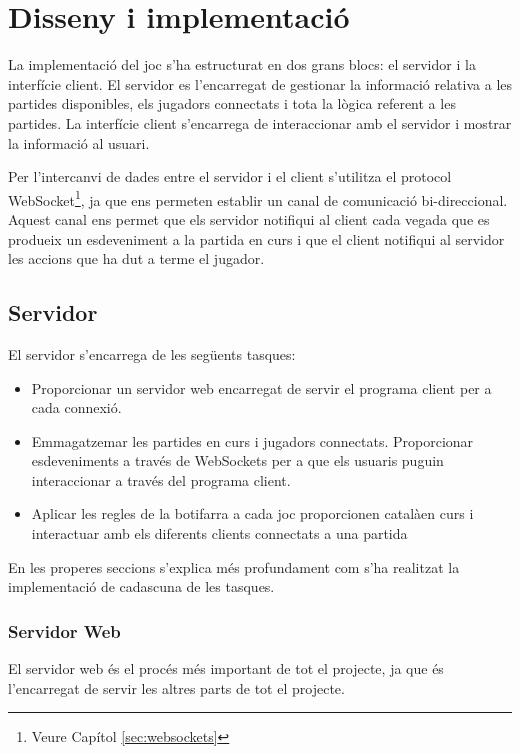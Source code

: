 \chapter{Disseny i implementació}
\label{chap:implementacio}

La implementació del joc s'ha estructurat en dos grans blocs: el servidor i la interfície client. El servidor es l'encarregat de gestionar la informació relativa a les partides disponibles, els jugadors connectats i tota la lògica referent a les partides. La interfície client s'encarrega de interaccionar amb el servidor i mostrar la informació al usuari. 

Per l'intercanvi de dades entre el servidor i el client s'utilitza el protocol WebSocket\footnote{Veure Capítol \ref{sec:websockets}},  ja que ens permeten establir un canal de comunicació bi-direccional. Aquest canal ens permet que els servidor notifiqui al client cada vegada que es produeix un esdeveniment a la partida en curs i que el client notifiqui al servidor les accions que ha dut a terme el jugador. 

\section{Servidor}

El servidor s'encarrega de les següents tasques: 

\begin{itemize}
\item{Proporcionar un servidor web encarregat de servir el programa client per a cada connexió.}
\item{Emmagatzemar les partides en curs i jugadors connectats. Proporcionar esdeveniments a través de WebSockets per a que els usuaris puguin interaccionar a través del programa client. }
\item{Aplicar les regles de la botifarra a cada joc proporcionen catalàen curs i interactuar amb els diferents clients connectats a una partida}
\end{itemize}

En les properes seccions s'explica més profundament com s'ha realitzat la implementació de cadascuna de les tasques. 

\subsection{Servidor Web}

El servidor web és el procés més important de tot el projecte, ja que és l'encarregat de servir les altres parts de tot el projecte. 

